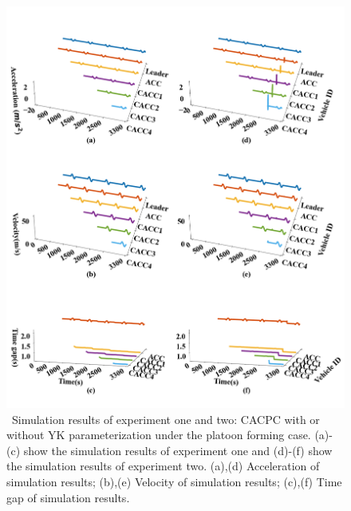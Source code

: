 \documentclass[a4paper,fleqn]{cas-sc}
\begin{document}
\begin{figure}
  \centering
  \includegraphics[width=14cm]{figs/c_form.png}
  \caption{~Simulation results of experiment one and two: CACPC with or without YK parameterization under the platoon forming case. (a)-(c) show the simulation results of experiment one and (d)-(f) show the simulation results of experiment two. (a),(d) Acceleration of simulation results; (b),(e) Velocity of simulation results; (c),(f) Time gap of simulation results.}
  \label{new1}
\end{figure}
\end{document}
